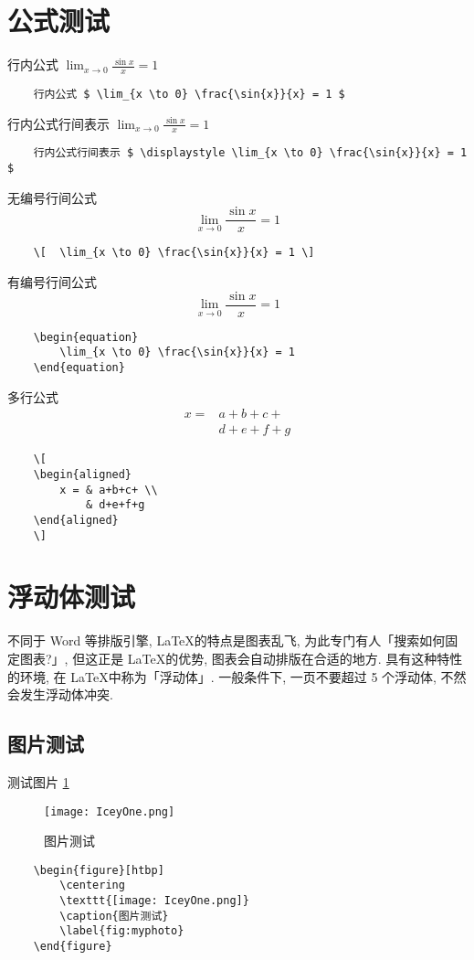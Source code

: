 \section{公式测试}
行内公式 $ \lim_{x \to 0} \frac{\sin{x}}{x} = 1 $
\begin{lstlisting}
    行内公式 $ \lim_{x \to 0} \frac{\sin{x}}{x} = 1 $
\end{lstlisting}
行内公式行间表示 $ \displaystyle \lim_{x \to 0} \frac{\sin{x}}{x} = 1 $ 
\begin{lstlisting}
    行内公式行间表示 $ \displaystyle \lim_{x \to 0} \frac{\sin{x}}{x} = 1 $ 
\end{lstlisting}
无编号行间公式
\[  \lim_{x \to 0} \frac{\sin{x}}{x} = 1 \] 
\begin{lstlisting}
    \[  \lim_{x \to 0} \frac{\sin{x}}{x} = 1 \] 
\end{lstlisting}
有编号行间公式
\begin{equation}
    \lim_{x \to 0} \frac{\sin{x}}{x} = 1 
\end{equation}
\begin{lstlisting}
    \begin{equation}
        \lim_{x \to 0} \frac{\sin{x}}{x} = 1 
    \end{equation}
\end{lstlisting}
多行公式
\[
    \begin{aligned}
        x = & a+b+c+ \\
            & d+e+f+g
    \end{aligned} 
\]
\begin{lstlisting}
    \[
    \begin{aligned}
        x = & a+b+c+ \\
            & d+e+f+g
    \end{aligned} 
    \]
\end{lstlisting}
\section{浮动体测试}
不同于 Word 等排版引擎, \LaTeX 的特点是图表乱飞, 为此专门有人「搜索如何固定图表?」, 但这正是 \LaTeX 的优势, 图表会自动排版在合适的地方. 具有这种特性的环境, 在 \LaTeX 中称为「浮动体」. 一般条件下, 一页不要超过 5 个浮动体, 不然会发生浮动体冲突.
\subsection{图片测试}
测试图片 \ref{fig:myphoto}
\begin{figure}[htbp]
    \centering
    \texttt{[image: IceyOne.png]}
    \caption{图片测试}
    \label{fig:myphoto}
\end{figure}
\begin{lstlisting}
    \begin{figure}[htbp]
        \centering
        \texttt{[image: IceyOne.png]}
        \caption{图片测试}
        \label{fig:myphoto}
    \end{figure}
\end{lstlisting}
